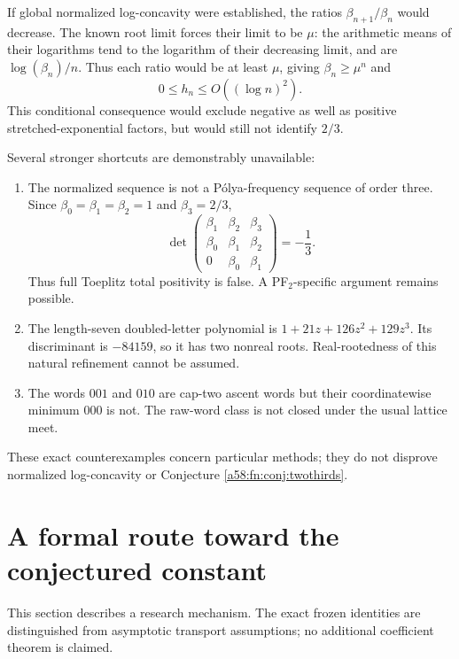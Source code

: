 \documentclass[11pt,letterpaper]{article}
\theoremstyle{remark}
\begin{document}
If global normalized log-concavity were established, the ratios $\beta_{n+1}/\beta_n$ would decrease. The known root limit forces their limit to be $\mu$: the arithmetic means of their logarithms tend to the logarithm of their decreasing limit, and are $\log(\beta_n)/n$. Thus each ratio would be at least $\mu$, giving $\beta_n\ge\mu^n$ and
\[
 0\le h_n\le O((\log n)^2).
\]
This conditional consequence would exclude negative as well as positive stretched-exponential factors, but would still not identify $2/3$.

Several stronger shortcuts are demonstrably unavailable:
\begin{enumerate}
\item The normalized sequence is not a P\'olya-frequency sequence of order three. Since $\beta_0=\beta_1=\beta_2=1$ and $\beta_3=2/3$,
\[
 \det\begin{pmatrix}\beta_1&\beta_2&\beta_3\\
 \beta_0&\beta_1&\beta_2\\0&\beta_0&\beta_1\end{pmatrix}=-\frac13.
\]
Thus full Toeplitz total positivity is false. A PF$_2$-specific argument remains possible.
\item The length-seven doubled-letter polynomial is
$1+21z+126z^2+129z^3$. Its discriminant is $-84159$, so it has two nonreal roots. Real-rootedness of this natural refinement cannot be assumed.
\item The words $001$ and $010$ are cap-two ascent words but their coordinatewise minimum $000$ is not. The raw-word class is not closed under the usual lattice meet.
\end{enumerate}
These exact counterexamples concern particular methods; they do not disprove normalized log-concavity or Conjecture \ref{a58:fn:conj:twothirds}.

\section{A formal route toward the conjectured constant}\label{a58:fn:sec:formal}
This section describes a research mechanism. The exact frozen identities are distinguished from asymptotic transport assumptions; no additional coefficient theorem is claimed.
\end{document}
